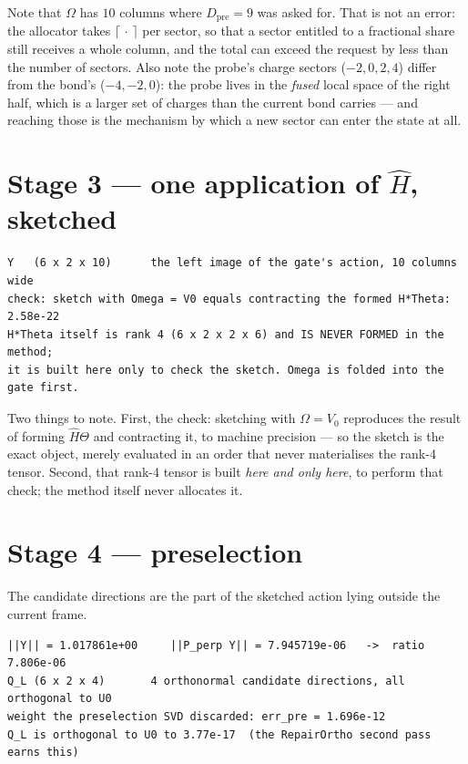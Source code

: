\documentclass[11pt,a4paper]{article}
\newcommand{\Hb}{\hat{H}}
\newcommand{\Theb}{\Theta}
\newcommand{\Om}{\Omega}
\newcommand{\Dpre}{D_{\mathrm{pre}}}
\begin{document}
Note that $\Om$ has $10$ columns where $\Dpre = 9$ was asked for. That is not an error: the
allocator takes $\lceil\,\cdot\,\rceil$ per sector, so that a sector entitled to a fractional
share still receives a whole column, and the total can exceed the request by less than the number
of sectors. Also note the probe's charge sectors ($-2,0,2,4$) differ from the bond's
($-4,-2,0$): the probe lives in the \emph{fused} local space of the right half, which is a
larger set of charges than the current bond carries --- and reaching those is the mechanism by
which a new sector can enter the state at all.

\section{Stage 3 --- one application of $\Hb$, sketched}

\begin{lstlisting}
Y   (6 x 2 x 10)      the left image of the gate's action, 10 columns wide
check: sketch with Omega = V0 equals contracting the formed H*Theta:  2.58e-22
H*Theta itself is rank 4 (6 x 2 x 2 x 6) and IS NEVER FORMED in the method;
it is built here only to check the sketch. Omega is folded into the gate first.
\end{lstlisting}

\noindent
Two things to note. First, the check: sketching with $\Om = V_0$ reproduces the result of forming
$\Hb\Theb$ and contracting it, to machine precision --- so the sketch is the exact object,
merely evaluated in an order that never materialises the rank-4 tensor. Second, that rank-4
tensor is built \emph{here and only here}, to perform that check; the method itself never
allocates it.

\section{Stage 4 --- preselection}

The candidate directions are the part of the sketched action lying outside the current frame.

\begin{lstlisting}
||Y|| = 1.017861e+00     ||P_perp Y|| = 7.945719e-06   ->  ratio 7.806e-06
Q_L (6 x 2 x 4)       4 orthonormal candidate directions, all orthogonal to U0
weight the preselection SVD discarded: err_pre = 1.696e-12
Q_L is orthogonal to U0 to 3.77e-17  (the RepairOrtho second pass earns this)
\end{lstlisting}
\end{document}
